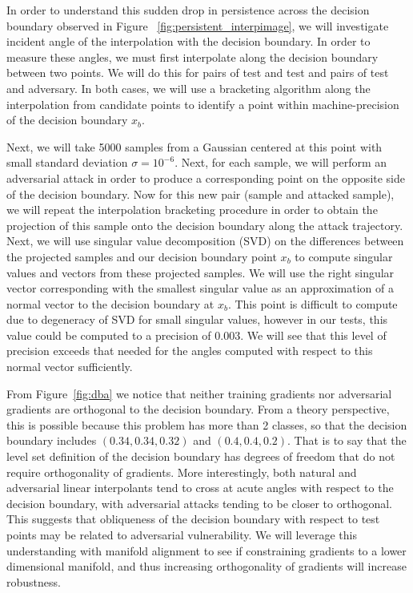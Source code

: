 In order to understand this sudden drop in persistence across the decision boundary observed in Figure ~\ref{fig:persistent_interpimage}, we will investigate incident angle of the interpolation with the decision boundary. In order to measure these angles, we must first interpolate along the decision boundary between two points. We will do this for pairs of test and test and pairs of test and adversary. In both cases, we will use a bracketing algorithm along the interpolation from candidate points to identify a point within machine-precision of the decision boundary $x_b$. 

Next, we will take 5000 samples from a Gaussian centered at this point with small standard deviation $\sigma = 10^{-6}$. Next, for each sample, we will perform an adversarial attack in order to produce a corresponding point on the opposite side of the decision boundary. Now for this new pair (sample and attacked sample), we will repeat the interpolation bracketing procedure in order to obtain the projection of this sample onto the decision boundary along the attack trajectory. Next, we will use singular value decomposition (SVD) on the differences between the projected samples and our decision boundary point $x_b$  to compute singular values and vectors from these projected samples. We will use the right singular vector corresponding with the smallest singular value as an approximation of a normal vector to the decision boundary at $x_b$. This point is difficult to compute due to degeneracy of SVD for small singular values, however in our tests, this value could be computed to a precision of 0.003. We will see that this level of precision exceeds that needed for the angles computed with respect to this normal vector sufficiently. 

From Figure~\ref{fig:dba} we notice that neither training gradients
nor adversarial gradients are orthogonal to the decision
boundary. From a theory perspective, this is possible because this
problem has more than 2 classes, so that the decision boundary
includes $(0.34, 0.34, 0.32)$ and $(0.4, 0.4, 0.2)$. That is to say
that the level set definition of the decision boundary has degrees of
freedom that do not require orthogonality of gradients. More
interestingly, both natural and adversarial linear interpolants tend
to cross at acute angles with respect to the decision boundary, with
adversarial attacks tending to be closer to orthogonal. This suggests
that obliqueness of the decision boundary with respect to test points
may be related to adversarial vulnerability. We will leverage this understanding with manifold alignment to see if constraining gradients to a lower dimensional manifold, and thus increasing orthogonality of gradients will increase robustness. 

